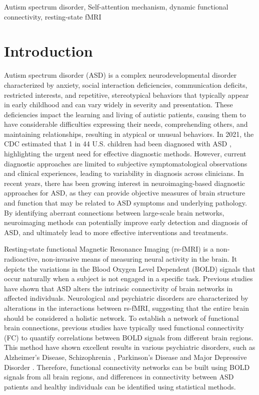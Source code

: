 \documentclass[journal,twoside,web]{ieeecolor}
\begin{document}
\begin{IEEEkeywords}
 Autism spectrum disorder, Self-attention mechanism, dynamic functional connectivity, resting-state fMRI
\end{IEEEkeywords}

\section{Introduction}
Autism spectrum disorder (ASD) is a complex neurodevelopmental disorder characterized by anxiety, social interaction deficiencies, communication deficits, restricted interests, and repetitive, stereotypical behaviors that typically appear in early childhood and can vary widely in severity and presentation\cite{puli2019toward, van2021abnormal, kojovic2019sensory}. These deficiencies impact the learning and living of autistic patients, causing them to have considerable difficulties expressing their needs, comprehending others, and maintaining relationships, resulting in atypical or unusual behaviors. In 2021, the CDC estimated that 1 in 44 U.S. children had been diagnosed with ASD \cite{maenner2021prevalence}, highlighting the urgent need for effective diagnostic methods. However, current diagnostic approaches are limited to subjective symptomatological observations and clinical experiences, leading to variability in diagnosis across clinicians\cite{xia2022dynamic}. In recent years, there has been growing interest in neuroimaging-based diagnostic approaches for ASD, as they can provide objective measures of brain structure and function that may be related to ASD symptoms and underlying pathology. By identifying aberrant connections between large-scale brain networks, neuroimaging methods can potentially improve early detection and diagnosis of ASD, and ultimately lead to more effective interventions and treatments.

Resting-state functional Magnetic Resonance Imaging (rs-fMRI) is a non-radioactive, non-invasive means of measuring neural activity in the brain. It depicts the variations in the Blood Oxygen Level Dependent (BOLD) signals that occur naturally when a subject is not engaged in a specific task. Previous studies have shown that ASD alters the intrinsic connectivity of brain networks in affected individuals\cite{monk2009abnormalities}. Neurological and psychiatric disorders are characterized by alterations in the interactions between rs-fMRI, suggesting that the entire brain should be considered a holistic network\cite{woodward2015resting}. To establish a network of functional brain connections, previous studies have typically used functional connectivity (FC) to quantify correlations between BOLD signals from different brain regions. This method have shown excellent results in various psychiatric disorders, such as Alzheimer's Disease\cite{ju2017early}, Schizophrenia
\cite{falakshahi2020meta}, Parkinson’s Disease\cite{li2022connectivity}
 and Major Depressive Disorder \cite{zeng2012identifying}. Therefore, functional connectivity networks can be built using BOLD signals from all brain regions, and differences in connectivity between ASD patients and healthy individuals can be identified using statistical methods\cite{woodward2015resting, assaf2010abnormal}.
\end{document}
